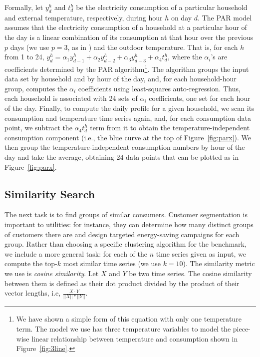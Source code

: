 \documentclass[prodmode,acmtods]{acmsmall}
\begin{document}
Formally, let $y^h_d$ and $t^h_d$ be the electricity consumption of a particular household and external temperature, respectively, during hour $h$ on day $d$.  The PAR model assumes that the electricity consumption of a household at a particular hour of the day is a linear combination of its consumption at that hour over the previous $p$ days (we use $p=3$, as in \cite{omid}) and the outdoor temperature.  That is, for each $h$ from 1 to 24, $y^h_d = \alpha_1 y^h_{d-1} + \alpha_2 y^h_{d-2} + \alpha_3 y^h_{d-3} + \alpha_4 t^h_d$, where the $\alpha_i$'s are coefficients determined by the PAR algorithm\footnote{We have shown a simple form of this equation with only one temperature term.  The model we use has three temperature variables to model the piece-wise linear relationship between temperature and consumption shown in Figure~\ref{fig:3line}.}.  The algorithm groups the input data set by household and by hour of the day, and, for each household-hour group, computes the $\alpha_i$ coefficients using least-squares auto-regression.  Thus, each household is associated with 24 sets of $\alpha_i$ coefficients, one set for each hour of the day.  Finally, to compute the daily profile for a given household, we scan its consumption and temperature time series again, and, for each consumption data point, we subtract the $\alpha_4 t^h_d$ term from it to obtain the temperature-independent consumption component (i.e., the blue curve at the top of Figure~\ref{fig:parx}).  We then group the temperature-independent consumption numbers by hour of the day and take the average, obtaining 24 data points that can be plotted as in Figure~\ref{fig:parx}.

\subsection{Similarity Search}

The next task is to find groups of similar consumers.  Customer segmentation is important to utilities: for instance, they can determine how many distinct groups of customers there are and design targeted energy-saving campaigns for each group.  Rather than choosing a specific clustering algorithm for the benchmark, we include a more general task: for each of the $n$ time series given as input, we compute the top-$k$ most similar time series (we use $k=10$).  The similarity metric we use is \emph{cosine similarity}.  Let $X$ and $Y$ be two time series.  The cosine similarity between them is defined as their dot product divided by the product of their vector lengths, i.e, $\frac{X \cdot Y} {||X|| * ||Y||}$.  
\end{document}
